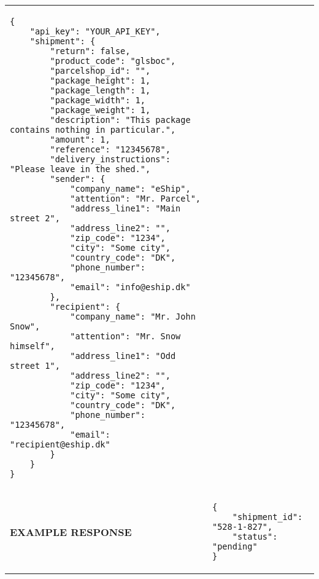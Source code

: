 \documentclass{article}
\begin{document}
\begin{longtable}{l|p{10cm}}
\begin{lstlisting}
{
    "api_key": "YOUR_API_KEY",
    "shipment": {
        "return": false,
        "product_code": "glsboc",
        "parcelshop_id": "",
        "package_height": 1,
        "package_length": 1,
        "package_width": 1,
        "package_weight": 1,
        "description": "This package contains nothing in particular.",
        "amount": 1,
        "reference": "12345678",
        "delivery_instructions": "Please leave in the shed.",
        "sender": {
            "company_name": "eShip",
            "attention": "Mr. Parcel",
            "address_line1": "Main street 2",
            "address_line2": "",
            "zip_code": "1234",
            "city": "Some city",
            "country_code": "DK",
            "phone_number": "12345678",
            "email": "info@eship.dk"
        },
        "recipient": {
            "company_name": "Mr. John Snow",
            "attention": "Mr. Snow himself",
            "address_line1": "Odd street 1",
            "address_line2": "",
            "zip_code": "1234",
            "city": "Some city",
            "country_code": "DK",
            "phone_number": "12345678",
            "email": "recipient@eship.dk"
        }
    }
}
	\end{lstlisting}\\
	\textbf{EXAMPLE RESPONSE} & \begin{lstlisting}
{
	"shipment_id": "528-1-827",
	"status": "pending"
}
	\end{lstlisting}\\
\end{longtable}


\newpage
\end{document}
